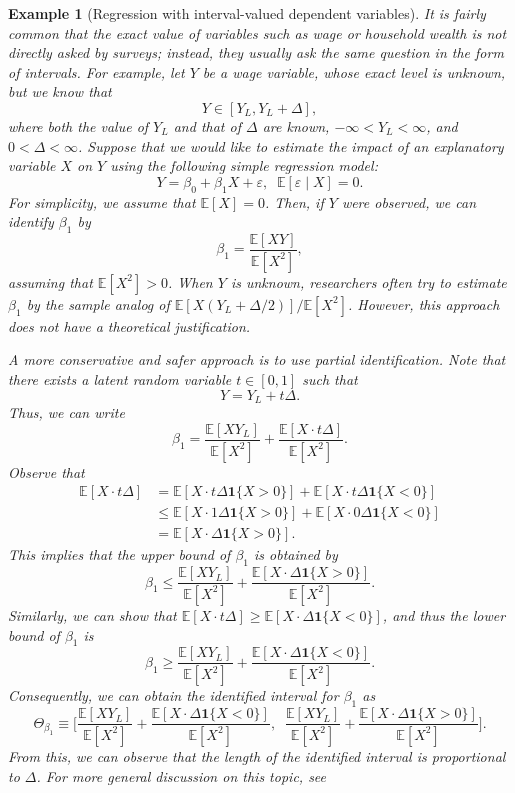 \documentclass[10.5pt, A4paper, openany, uplatex]{book}
\newcommand{\mbf}{\mathbf}
\newcommand{\eps}{\varepsilon}
\newcommand{\E}{\mathbb{E}}
\newtheorem{example}[theorem]{Example}
\numberwithin{equation}{section}
\begin{document}
\begin{example}[Regression with interval-valued dependent variables]\upshape
	It is fairly common that the exact value of variables such as wage or household wealth is not directly asked by surveys; instead, they usually ask the same question in the form of intervals.
	For example, let $Y$ be a wage variable, whose exact level is unknown, but we know that
	\[
	Y \in [Y_L, Y_L + \Delta],
	\]
	where both the value of $Y_L$ and that of $\Delta$ are known, $-\infty < Y_L < \infty$, and $0 < \Delta < \infty$.
	Suppose that we would like to estimate the impact of an explanatory variable $X$ on $Y$ using the following simple 	regression model:
	\[
	Y =  \beta_0 +  \beta_1 X + \eps, \;\; \E[\eps \mid X] = 0.
	\]
	For simplicity, we assume that $\E [X] = 0$.
	Then, if $Y$ were observed, we can identify $\beta_1$ by
	\[
		 \beta_1 = \frac{\E[ XY ]}{\E[X^2]},
	\]
	assuming that $\E [X^2] > 0$.
	When $Y$ is unknown, researchers often try to estimate $\beta_1$ by the sample analog of $\E [X(Y_L + \Delta/2)]/\E[X^2]$.
	However, this approach does not have a theoretical justification.
	\bigskip

	A more conservative and safer approach is to use partial identification. 
	Note that there exists a latent random variable $t \in [0, 1]$ such that
	\[
		Y = Y_L + t \Delta.
	\]
	Thus, we can write
	\[
		\beta_1 = \frac{\E[XY_L]}{\E[X^2]} + \frac{\E[X \cdot t \Delta]}{\E[X^2]}.
	\]
	Observe that
	\begin{align*}
		\E[X \cdot  t\Delta] 
		& =  \E[X \cdot  t \Delta\mbf{1}\{ X > 0 \}] + \E[X \cdot  t \Delta\mbf{1}\{ X < 0\}] \\
		& \le \E[X \cdot  1 \Delta\mbf{1}\{ X > 0 \}] + \E[X \cdot  0 \Delta\mbf{1}\{ X < 0\}] \\
		& =  \E[X \cdot  \Delta\mbf{1}\{ X > 0\}].
	\end{align*}
	This implies that the upper bound of  $\beta_1$ is obtained by
	\[
	 	\beta_1 \le \frac{\E[XY_L]}{\E[X^2]} + \frac{\E[X \cdot \Delta\mbf{1}\{ X > 0\}]}{\E[X^2]}	.
	 \]
	Similarly, we can show that $\E [X \cdot t\Delta] \ge \E[X \cdot \Delta\mbf{1}\{ X < 0\}]$, and thus the lower bound of  $\beta_1$ is
	\[
		\beta_1 \ge \frac{\E[XY_L]}{\E[X^2]} + \frac{\E[X \cdot \Delta\mbf{1}\{ X < 0\}]}{\E[X^2]}.
	\]
	Consequently, we can obtain the identified interval for  $\beta_1$ as
	\[
	\Theta_{\beta_1} \equiv \Bigg[
	\frac{\E[XY_L]}{\E[X^2]} + \frac{\E[X \cdot \Delta \mbf{1}\{ X < 0 \}]}{\E[X^2]},
	\;\;
	\frac{\E[XY_L]}{\E[X^2]} + \frac{\E[X \cdot \Delta\mbf{1}\{ X > 0 \}]}{\E[X^2]}
	\Bigg].
	\]
	From this, we can observe that the length of the identified interval is proportional to $\Delta$.
	For more general discussion on this topic, see \cite{bontemps2012set}
\end{example}
\end{document}
